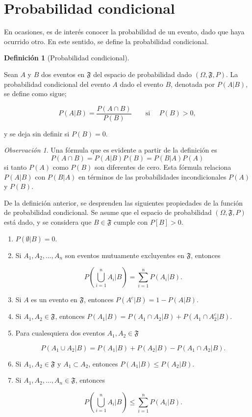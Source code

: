 \documentclass[
  letterpaper,
  DIV=11,
  numbers=noendperiod]{scrreport}
\theoremstyle{plain}
\theoremstyle{definition}
\newtheorem{definition}{Definición}[chapter]
\theoremstyle{definition}
\theoremstyle{plain}
\theoremstyle{remark}
\newtheorem*{remark}{Observación}
\begin{document}
\section{Probabilidad condicional}\label{probabilidad-condicional}

En ocasiones, es de interés conocer la probabilidad de un evento, dado
que haya ocurrido otro. En este sentido, se define la probabilidad
condicional.

\begin{definition}[Probabilidad
condicional]\protect\hypertarget{def-pcond}{}\label{def-pcond}

Sean \(A\) y \(B\) dos eventos en \(\mathfrak{F}\) del espacio de
probabilidad dado \((\Omega, \mathfrak{F}, P)\). La probabilidad
condicional del evento \(A\) dado el evento \(B\), denotada por
\(P(A|B)\), se define como sigue;

\[P(A|B)= \frac{P(A\cap B)}{P(B)}\qquad\text{si }\quad P(B)>0,\]

y se deja sin definir si \(P(B)=0\).

\end{definition}

\begin{remark}
Una fórmula que es evidente a partir de la definición es
\[P(A\cap B)= P(A|B)P(B)=P(B|A)P(A)\] si tanto \(P(A)\) como \(P(B)\)
son diferentes de cero. Esta fórmula relaciona \(P(A|B)\) con \(P(B|A)\)
en términos de las probabilidades incondicionales \(P(A)\) y \(P(B)\).
\end{remark}

De la definición anterior, se desprenden las siguientes propiedades de
la función de probabilidad condicional. Se asume que el espacio de
probabilidad \((\Omega, \mathfrak{F}, P)\) está dado, y se considera que
\(B\in\mathfrak{F}\) cumple con \(P[B]>0\).

\begin{enumerate}
\def\labelenumi{\roman{enumi}.}
\item
  \(P(\emptyset| B)=0\).
\item
  Si \(A_1, A_2, \ldots, A_n\) son eventos mutuamente excluyentes en
  \(\mathfrak{F}\), entonces

  \[P\left(\bigcup_{i=1}^n A_i|B\right)= \sum_{i=1}^n P(A_i|B).\]
\item
  Si \(A\) es un evento en \(\mathfrak{F}\), entonces
  \(P(A^c| B)=1-P(A|B)\).
\item
  Si \(A_1, A_2\in \mathfrak{F}\), entonces
  \(P(A_1|B)=P(A_1\cap A_2|B)+ P(A_1\cap A_2^c|B)\).
\item
  Para cualesquiera dos eventos \(A_1,A_2\in \mathfrak{F}\)

  \[P(A_1\cup A_2|B)=P(A_1|B)+P(A_2|B)-P(A_1\cap A_2|B).\]
\item
  Si \(A_1, A_2\in\mathfrak{F}\) y \(A_1\subset A_2\), entonces
  \(P(A_1|B)\leq P(A_2|B)\).
\item
  Si \(A_1, A_2,\ldots, A_n\in\mathfrak{F}\), entonces

  \[P\left(\bigcup_{i=1}^n A_i|B\right)\leq \sum_{i=1}^n P(A_i|B).\]
\end{enumerate}
\end{document}
